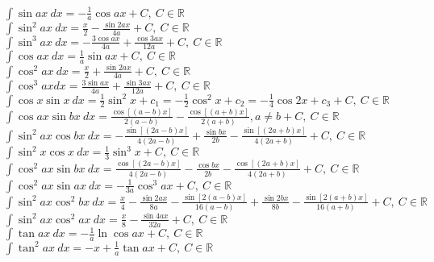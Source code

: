 \documentclass[10pt,landscape]{article}
\begin{document}
\begin{multicols}{3}
$\int \sin ax \ dx = -\frac{1}{a} \cos ax + C,\ C \in \mathbb{R}$\\
$\int \sin^2 ax\  dx = \frac{x}{2} - \frac{\sin 2ax} {4a} + C,\ C \in \mathbb{R}$\\
$\int \sin^3 ax \ dx = -\frac{3 \cos ax}{4a} + \frac{\cos 3ax} {12a} + C,\ C \in \mathbb{R}$\\
$\int \cos ax\ dx= \frac{1}{a} \sin ax + C,\ C \in \mathbb{R}$\\
$\int \cos^2 ax\ dx = \frac{x}{2}+\frac{ \sin 2ax}{4a} + C,\ C \in \mathbb{R}$\\
$\int \cos^3 ax dx = \frac{3 \sin ax}{4a}+\frac{ \sin 3ax}{12a} + C,\ C \in \mathbb{R}$\\
$\int \cos x \sin x\ dx = \frac{1}{2}\sin^2 x + c_1 = -\frac{1}{2} \cos^2x + c_2 = -\frac{1}{4} \cos 2x + c_3 + C,\ C \in \mathbb{R}$\\
$\int \cos ax \sin bx\ dx = \frac{\cos[(a-b) x]}{2(a-b)} -\frac{\cos[(a+b)x]}{2(a+b)} , a\ne b + C,\ C \in \mathbb{R}$\\
$\int \sin^2 ax \cos bx\ dx = -\frac{\sin[(2a-b)x]}{4(2a-b)} + \frac{\sin bx}{2b} - \frac{\sin[(2a+b)x]}{4(2a+b)} + C,\ C \in \mathbb{R}$\\
$\int \sin^2 x \cos x\ dx = \frac{1}{3} \sin^3 x + C,\ C \in \mathbb{R}$\\
$\int \cos^2 ax \sin bx\ dx = \frac{\cos[(2a-b)x]}{4(2a-b)} - \frac{\cos bx}{2b} - \frac{\cos[(2a+b)x]}{4(2a+b)} + C,\ C \in \mathbb{R}$\\
$\int \cos^2 ax \sin ax\ dx = -\frac{1}{3a}\cos^3{ax} + C,\ C \in \mathbb{R}$\\
$\int \sin^2 ax \cos^2 bx\ dx = \frac{x}{4}-\frac{\sin 2ax}{8a}-\frac{\sin[2(a-b)x]}{16(a-b)}+ \frac{\sin 2bx}{8b}-\frac{\sin[2(a+b)x]}{16(a+b)} + C,\ C \in \mathbb{R}$\\
$\int \sin^2 ax \cos^2 ax\ dx = \frac{x}{8}-\frac{\sin 4ax}{32a} + C,\ C \in \mathbb{R}$\\
$\int \tan ax\ dx = -\frac{1}{a} \ln \cos ax + C,\ C \in \mathbb{R}$\\
$\int \tan^2 ax\ dx = -x + \frac{1}{a} \tan ax + C,\ C \in \mathbb{R}$\\

\end{multicols}
\end{document}
